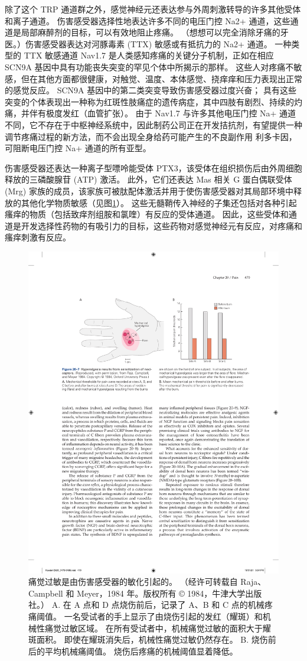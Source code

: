除了这个 TRP 通道群之外，感觉神经元还表达参与外周刺激转导的许多其他受体和离子通道。 
伤害感受器选择性地表达许多不同的电压门控 Na2+ 通道，这些通道是局部麻醉剂的目标，可以有效地阻止疼痛。 
（想想可以完全消除牙痛的牙医。）伤害感受器表达对河豚毒素 (TTX) 敏感或有抵抗力的 Na2+ 通道。 
一种类型的 TTX 敏感通道 Nav1.7 是人类感知疼痛的关键分子机制，正如在相应 SCN9A 基因中具有功能丧失突变的罕见个体中所揭示的那样。 
这些人对疼痛不敏感，但在其他方面都很健康，对触觉、温度、本体感觉、挠痒痒和压力表现出正常的感觉反应。 
SCN9A 基因中的第二类突变导致伤害感受器过度兴奋； 具有这些突变的个体表现出一种称为红斑性肢痛症的遗传病症，其中四肢有剧烈、持续的灼痛，并伴有极度发红（血管扩张）。 
由于 Nav1.7 与许多其他电压门控 Na+ 通道不同，它不存在于中枢神经系统中，因此制药公司正在开发拮抗剂，有望提供一种调节疼痛过程的新方法，而不会出现全身给药可能产生的不良副作用 利多卡因，可阻断电压门控 Na+ 通道的所有亚型。


伤害感受器还表达一种离子型嘌呤能受体 PTX3，该受体在组织损伤后由外周细胞释放的三磷酸腺苷 (ATP) 激活。 
此外，它们还表达 Mas 相关 G 蛋白偶联受体 (Mrg) 家族的成员，该家族可被肽配体激活并用于使伤害感受器对其局部环境中释放的其他化学物质敏感（见图\ref{fig:20_7}）。 
这些无髓鞘传入神经的子集还包括对各种引起瘙痒的物质（包括致痒剂组胺和氯喹）有反应的受体通道。 
因此，这些受体和通道是开发选择性药物的有吸引力的目标，这些药物对感觉神经元有反应，对疼痛和瘙痒刺激有反应。


\begin{figure}[htbp]
	\centering
	\includegraphics[width=0.7\linewidth]{chap20/fig_20_7}
	\caption{痛觉过敏是由伤害感受器的敏化引起的。 （经许可转载自 Raja、Campbell 和 Meyer，1984 年。版权所有 © 1984，牛津大学出版社。）
		A. 在 A 点和 D 点烧伤前后，记录了 A、B 和 C 点的机械疼痛阈值。 
		一名受试者的手上显示了由烧伤引起的发红（耀斑）和机械性痛觉过敏区域。 
		在所有受试者中，机械痛觉过敏的面积大于耀斑面积。 
		即使在耀斑消失后，机械性痛觉过敏仍然存在。 
		B. 烧伤前后的平均机械痛阈值。 
		烧伤后疼痛的机械阈值显着降低。}
	\label{fig:20_7}
\end{figure}

